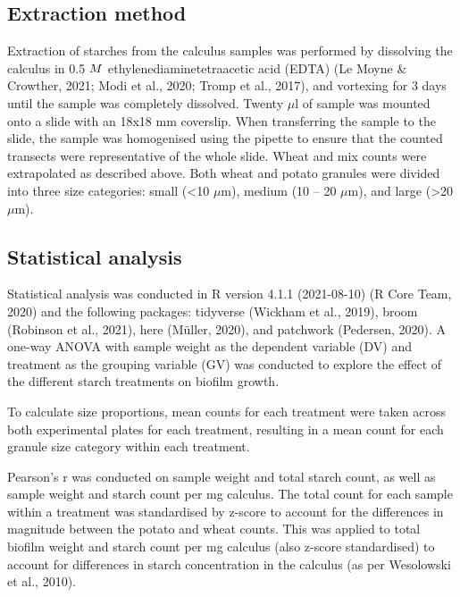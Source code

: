 \documentclass[
]{article}
\begin{document}
\hypertarget{extraction-method}{%
\subsection{Extraction method}\label{extraction-method}}

Extraction of starches from the calculus samples was performed by dissolving the
calculus in 0.5 \(\tiny{M}\) ethylenediaminetetraacetic acid (EDTA)
(Le Moyne \& Crowther, 2021; Modi et al., 2020; Tromp et al., 2017),
and vortexing for 3 days until the sample was completely dissolved.
Twenty \(\mu\)l of sample was mounted onto a slide with an 18x18 mm coverslip.
When transferring the sample to the slide, the sample was homogenised using
the pipette to ensure that the counted transects were representative of the
whole slide. Wheat and mix counts were extrapolated as described above.
Both wheat and potato granules were divided into three size categories:
small (\textless10 \(\mu\)m), medium (10 -- 20 \(\mu\)m), and large (\textgreater20 \(\mu\)m).

\hypertarget{statistical-analysis}{%
\subsection{Statistical analysis}\label{statistical-analysis}}

Statistical analysis was conducted in R version 4.1.1 (2021-08-10) (R Core Team, 2020) and
the following packages: tidyverse (Wickham et al., 2019), broom (Robinson et al., 2021),
here (Müller, 2020), and patchwork (Pedersen, 2020).
A one-way ANOVA with sample weight as the dependent variable (DV) and treatment
as the grouping variable (GV) was conducted to explore the effect of the different
starch treatments on biofilm growth.

To calculate size proportions, mean counts for each treatment were taken across
both experimental plates for each treatment, resulting in a mean count for each
granule size category within each treatment.

Pearson's r was conducted on sample weight and total starch count, as well as sample
weight and starch count per mg calculus. The total count for each sample within a
treatment was standardised by z-score to account for the differences in magnitude
between the potato and wheat counts.
This was applied to total biofilm weight and starch count per mg
calculus (also z-score standardised) to account for differences in starch
concentration in the calculus (as per Wesolowski et al., 2010).
\end{document}
